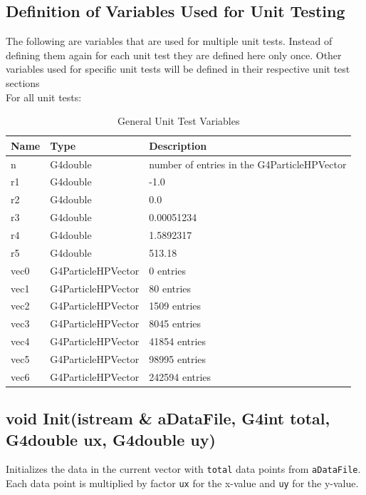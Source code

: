 \documentclass[12pt]{article}
\begin{document}
\subsection{Definition of Variables Used for Unit Testing}
The following are variables that are used for multiple unit tests. Instead of defining them again for each unit test they are defined here only once. Other variables used for specific unit tests will be defined in their respective unit test sections\\
For all unit tests:
\begin{table}[H]
\centering
\caption{General Unit Test Variables}\label{gen_var_table}
\begin{tabular}{lll}
\toprule
	\bf Name & \bf Type & \bf Description\\\midrule
	n 	& G4double 			& number of entries in the G4ParticleHPVector\\
	r1 	& G4double 			& -1.0\\
	r2	& G4double			& 0.0\\
	r3 	& G4double 			& 0.00051234\\
	r4 	& G4double 			& 1.5892317\\
	r5 	& G4double 			& 513.18\\
	vec0 & G4ParticleHPVector 	& 0 entries\\
	vec1 & G4ParticleHPVector	& 80 entries\\
	vec2 & G4ParticleHPVector 	& 1509 entries\\
	vec3 & G4ParticleHPVector 	& 8045 entries\\
	vec4 & G4ParticleHPVector 	& 41854 entries\\
	vec5 & G4ParticleHPVector 	& 98995 entries\\
	vec6 & G4ParticleHPVector 	& 242594 entries\\
\bottomrule		
\end{tabular}
\end{table}

\subsection{void Init(istream \& aDataFile, G4int total, G4double ux, G4double uy)} 
	Initializes the data in the current vector with \texttt{total} data points from \texttt{aDataFile}. Each data
	point is multiplied by factor \texttt{ux} for the x-value and \texttt{uy} for the y-value.
\end{document}
